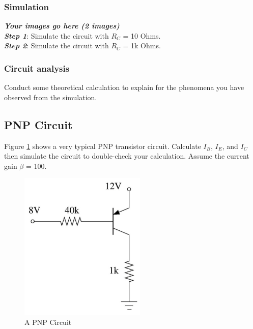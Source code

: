 \subsubsection{Simulation}
\textbf{\textit{Your images go here (2 images)}}\\
\textbf{\textit{Step 1}}: Simulate the circuit with $R_C$ = 10 Ohms.\\
\textbf{\textit{Step 2}}: Simulate the circuit with $R_C$ = 1k Ohms.
\vspace{8cm}\\

\subsubsection{Circuit analysis}
Conduct some theoretical calculation to explain for the phenomena you have observed from the simulation. \bigskip\\

\dotfill\bigskip\par\mbox{}\dotfill
\dotfill\bigskip\par\mbox{}\dotfill
\dotfill\bigskip\par\mbox{}\dotfill
\dotfill\bigskip\par\mbox{}\dotfill
\dotfill\bigskip\par\mbox{}\dotfill
\dotfill\bigskip\par\mbox{}\dotfill
\dotfill\bigskip\par\mbox{}\dotfill
\dotfill\bigskip\par\mbox{}\dotfill



\subsection{PNP Circuit}
Figure \ref{lab3_ex6_de} shows a very typical PNP transistor circuit.
Calculate $I_B$, $I_E$, and $I_C$ then simulate the circuit to double-check your calculation. Assume the current gain $\beta$ = 100.

\begin{figure}[H]
    \centering
    \includegraphics[width=6cm]{source/picture/bai_3/lab3_ex6_de.png}
    \caption{A PNP Circuit}
    \label{lab3_ex6_de}
\end{figure}

